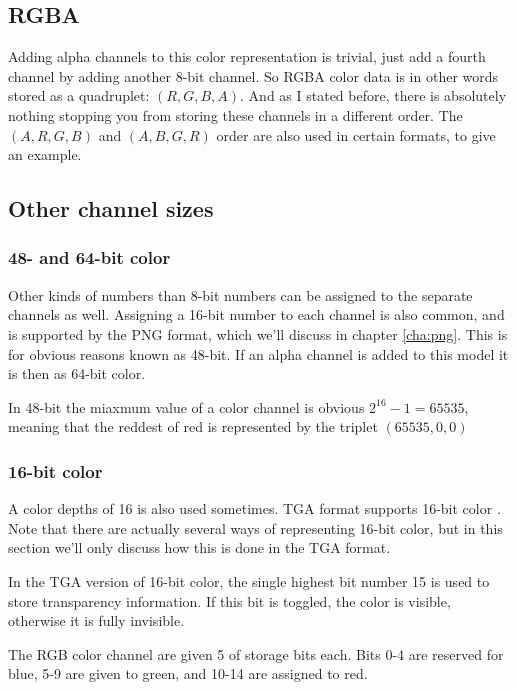 \subsection{RGBA}

Adding alpha channels to this color representation is trivial, just
add a fourth channel by adding another 8-bit channel. So RGBA color
data is in other words stored as a quadruplet: $(R,G,B,A)$. And as I
stated before, there is absolutely nothing stopping you from storing these
channels in a different order. The $(A,R,G,B)$ and $(A,B,G,R)$ order are also
used in certain formats, to give an example.

\subsection{Other channel sizes}
\label{sec:other-channel-sizes}

\subsubsection{48- and 64-bit color}

Other kinds of numbers than 8-bit numbers can be assigned to the
separate channels as well. Assigning a 16-bit number to each channel
is also common, and is supported by the PNG
format\cite{boutel:_png_portab_networ_graph_specif_version12}, which
we'll discuss in chapter \ref{cha:png}. This is for obvious reasons
known as 48-bit. If an alpha channel is added to this model it is then
as 64-bit color.

In 48-bit the miaxmum value of a color channel is obvious $2^{16} - 1
= 65535$, meaning that the reddest of red is represented by the
triplet $(65535, 0, 0)$

\subsubsection{16-bit color}

A color depths of 16 is also used sometimes. TGA format supports
16-bit color \cite{91:_truev_tga_file_format_specif}. Note that there
are actually several ways of representing 16-bit color, but in this
section we'll only discuss how this is done in the TGA format.

In the TGA version of 16-bit color, the single highest bit number 15 is used to
store transparency information. If this bit is toggled, the color is
visible, otherwise it is fully invisible.

The RGB color channel are given 5 of storage bits each. Bits 0-4 are
reserved for blue, 5-9 are given to green, and 10-14 are assigned to red.

